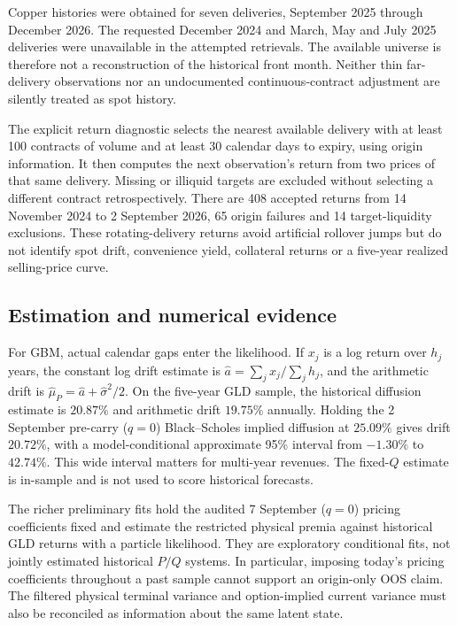 Copper histories were obtained for seven deliveries, September 2025 through
December 2026. The requested December 2024 and March, May and July 2025
deliveries were unavailable in the attempted retrievals. The available
universe is therefore not a reconstruction of the historical front month.
Neither thin far-delivery observations nor an undocumented continuous-contract
adjustment are silently treated as spot history.

The explicit return diagnostic selects the nearest available delivery with
at least 100 contracts of volume and at least 30 calendar days to expiry,
using origin information. It then computes the next observation's return
from two prices of that same delivery. Missing or illiquid targets are
excluded without selecting a different contract retrospectively. There are
408 accepted returns from 14 November 2024 to 2 September 2026, 65 origin
failures and 14 target-liquidity exclusions. These rotating-delivery returns
avoid artificial rollover jumps but do not identify spot drift, convenience
yield, collateral returns or a five-year realized selling-price curve.

\subsection{Estimation and numerical evidence}

For GBM, actual calendar gaps enter the likelihood. If $x_j$ is a log return
over $h_j$ years, the constant log drift estimate is
$\widehat a=\sum_jx_j/\sum_jh_j$, and the arithmetic drift is
$\widehat\mu_P=\widehat a+\widehat\sigma^2/2$. On the five-year GLD sample,
the historical diffusion estimate is $20.87\%$ and arithmetic drift
$19.75\%$ annually. Holding the 2 September pre-carry ($q=0$) Black--Scholes
implied diffusion at $25.09\%$ gives drift $20.72\%$, with a model-conditional approximate
95\% interval from $-1.30\%$ to $42.74\%$. This wide interval matters for
multi-year revenues. The fixed-$Q$ estimate is in-sample and is not
used to score historical forecasts.

The richer preliminary fits hold the audited 7 September ($q=0$) pricing
coefficients fixed and estimate the restricted physical premia against
historical GLD returns with a particle likelihood. They are exploratory
conditional fits, not jointly estimated historical $P/Q$ systems. In
particular, imposing today's pricing coefficients throughout a past sample
cannot support an origin-only OOS claim. The filtered physical terminal
variance and option-implied current variance must also be reconciled as
information about the same latent state.

